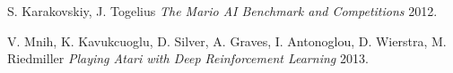 \documentclass[12pt]{article}
\begin{document}
\begin{thebibliography}{1}

 S. Karakovskiy, J. Togelius {\em The Mario AI Benchmark and Competitions} 2012.

 V. Mnih, K. Kavukcuoglu, D. Silver, A. Graves, I. Antonoglou, D. Wierstra, M. Riedmiller {\em Playing Atari with Deep Reinforcement Learning} 2013.

\end{thebibliography}
\end{document}
